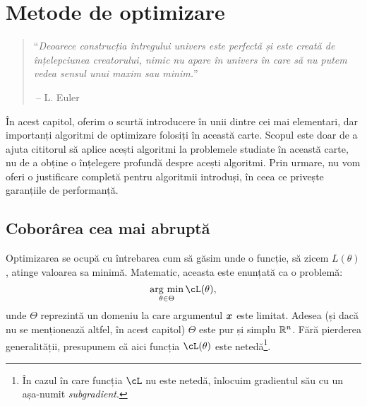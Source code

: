 \documentclass[../../book-main_ro.tex]{subfiles}
\begin{document}
\chapter{Metode de optimizare}
\label{app:optimization}

\begin{quote}
``{\em Deoarece construcția întregului univers este perfectă și este creată de înțelepciunea creatorului, nimic nu apare în univers în care să nu putem vedea sensul unui maxim sau minim.}''

$~$\hfill -- L. Euler
 \end{quote}
\vspace{5mm}

În acest capitol, oferim o scurtă introducere în unii dintre cei mai elementari, dar importanți algoritmi de optimizare folosiți în această carte. Scopul este doar de a ajuta cititorul să aplice acești algoritmi la problemele studiate în această carte, nu de a obține o înțelegere profundă despre acești algoritmi. Prin urmare, nu vom oferi o justificare completă pentru algoritmii introduși, în ceea ce privește garanțiile de performanță.

\section{Coborârea cea mai abruptă}


Optimizarea se ocupă cu întrebarea cum să găsim unde o funcție, să zicem $L(\theta)$, atinge valoarea sa minimă. Matematic, aceasta este enunțată ca o problemă:
\begin{equation}
    \argmin_{\theta \in \Theta} \cL(\theta),
\end{equation}
unde $\Theta$ reprezintă un domeniu la care argumentul $\bm{x}$ este limitat. Adesea (și dacă nu se menționează altfel, în acest capitol) $\Theta$ este pur și simplu $\mathbb{R}^n$. Fără pierderea generalității, presupunem că aici funcția $\cL(\theta)$ este netedă\footnote{În cazul în care funcția \(\cL\) nu este netedă, înlocuim gradientul său cu un așa-numit \textit{subgradient}.}.
\end{document}
